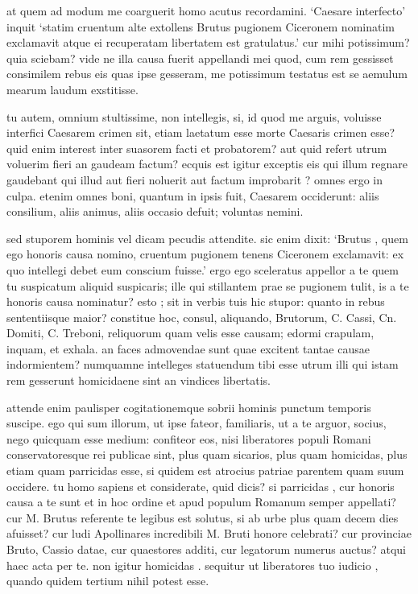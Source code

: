  at quem ad modum me coarguerit homo acutus recordamini. `Caesare interfecto' inquit `statim cruentum alte extollens Brutus pugionem Ciceronem nominatim exclamavit atque ei recuperatam libertatem est gratulatus.' cur mihi potissimum? quia sciebam? vide ne illa causa fuerit appellandi mei quod, cum rem gessisset consimilem rebus eis quas ipse gesseram, me potissimum testatus est se aemulum mearum laudum exstitisse.

 tu autem, omnium stultissime, non intellegis, si, id quod me arguis, voluisse interfici Caesarem crimen sit, etiam laetatum esse morte Caesaris crimen esse? quid enim interest inter suasorem facti et probatorem? aut quid refert utrum voluerim fieri an gaudeam factum? ecquis est igitur exceptis eis qui illum regnare gaudebant qui illud aut fieri noluerit aut factum improbarit ? omnes ergo in culpa. etenim omnes boni, quantum in ipsis fuit, Caesarem occiderunt: aliis consilium, aliis animus, aliis occasio defuit; voluntas nemini.

 sed stuporem hominis vel dicam pecudis attendite. sic enim dixit: `Brutus , quem ego honoris causa nomino, cruentum pugionem tenens Ciceronem exclamavit: ex quo intellegi debet eum conscium fuisse.' ergo ego sceleratus appellor a te quem tu suspicatum aliquid suspicaris; ille qui stillantem prae se pugionem tulit, is a te honoris causa nominatur? esto ; sit in verbis tuis hic stupor: quanto in rebus sententiisque maior? constitue hoc, consul, aliquando, Brutorum, C. Cassi, Cn. Domiti, C. Treboni, reliquorum quam velis esse causam; edormi crapulam, inquam, et exhala. an faces admovendae sunt quae excitent tantae causae indormientem? numquamne intelleges statuendum tibi esse utrum illi qui istam rem gesserunt homicidaene sint an vindices libertatis.

 attende enim paulisper cogitationemque sobrii hominis punctum temporis suscipe. ego qui sum illorum, ut ipse fateor, familiaris, ut a te arguor, socius, nego quicquam esse medium: confiteor eos, nisi liberatores populi Romani conservatoresque rei publicae sint, plus quam sicarios, plus quam homicidas, plus etiam quam parricidas esse, si quidem est atrocius patriae parentem quam suum occidere. tu homo sapiens et considerate, quid dicis? si parricidas , cur honoris causa a te sunt et in hoc ordine et apud populum Romanum semper appellati? cur M. Brutus referente te legibus est solutus, si ab urbe plus quam decem dies afuisset? cur ludi Apollinares incredibili M. Bruti honore celebrati? cur provinciae Bruto, Cassio datae, cur quaestores additi, cur legatorum numerus auctus? atqui haec acta per te. non igitur homicidas . sequitur ut liberatores tuo iudicio , quando quidem tertium nihil potest esse.

